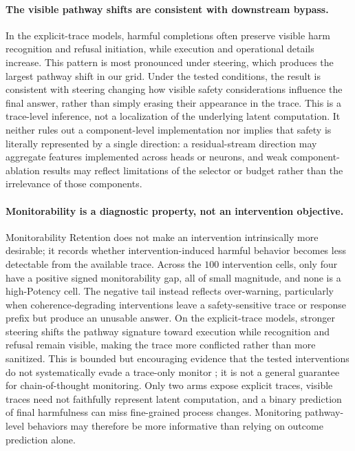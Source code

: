 \paragraph{The visible pathway shifts are consistent with downstream bypass.}
In the explicit-trace models, harmful completions often preserve visible harm
recognition and refusal initiation, while execution and operational details
increase. This pattern is most pronounced under steering, which produces the
largest pathway shift in our grid. Under the tested conditions, the result is
consistent with steering changing how visible safety considerations influence
the final answer, rather than simply erasing their appearance in the trace. This
is a trace-level inference, not a localization of the underlying latent
computation. It neither rules out a component-level implementation nor implies
that safety is literally represented by a single direction: a residual-stream
direction may aggregate features implemented across heads or neurons, and weak
component-ablation results may reflect limitations of the selector or budget
rather than the irrelevance of those components.

\paragraph{Monitorability is a diagnostic property, not an intervention objective.}
Monitorability Retention does not make an intervention intrinsically more
desirable; it records whether intervention-induced harmful behavior becomes
less detectable from the available trace. Across the $100$ intervention cells,
only four have a positive signed monitorability gap, all of small magnitude,
and none is a high-Potency cell. The negative tail instead reflects
over-warning, particularly when coherence-degrading interventions leave a
safety-sensitive trace or response prefix but produce an unusable answer. On
the explicit-trace models, stronger steering shifts the pathway signature
toward execution while recognition and refusal remain visible, making the trace
more conflicted rather than more sanitized. This is bounded but encouraging
evidence that the tested interventions do not systematically evade a
trace-only monitor \citep{baker2025cotmonitoring,korbak2025monitorability}; it
is not a general guarantee for chain-of-thought monitoring. Only two arms expose
explicit traces, visible traces need not faithfully represent latent
computation, and a binary prediction of final harmfulness can miss
fine-grained process changes. Monitoring pathway-level behaviors may therefore
be more informative than relying on outcome prediction alone.

